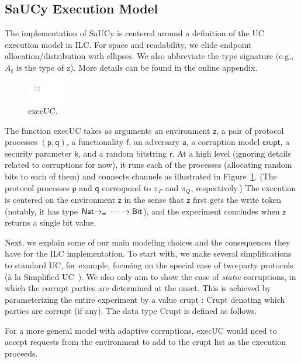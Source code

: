 \subsection{SaUCy Execution Model}
\label{subsec:concrete-uc}


The implementation of SaUCy is centered around a definition of the UC execution
model in ILC. For space and readability, we elide endpoint
allocation/distribution with ellipses. We also abbreviate the type signature
(e.g., $A_{\mathsf{z}}$ is the type of \textsf{z}). More details can be found in
the online appendix.


\begingroup
\setlength\intextsep{0pt}
\setlength{\columnsep}{10pt}
\begin{figure}
\centering
\includegraphics[width=0.15\textwidth]{graphics/execUC}
\caption{\textsf{execUC}.}
\label{fig:execUC-diagram}
\end{figure}
The function \textsf{execUC} takes as arguments an environment $\mathsf{z}$, a
pair of protocol processes $(\mathsf{p},\mathsf{q})$, a functionality
$\mathsf{f}$, an adversary $\mathsf{a}$, a corruption model $\mathsf{crupt}$, a
security parameter $\mathsf{k}$, and a random bitstring $\mathsf{r}$. At a high
level (ignoring details related to corruptions for now), it runs each of the
processes (allocating random bits to each of them) and connects channels as
illustrated in Figure~\ref{fig:execUC-diagram}.
(The protocol processes
$\mathsf{p}$ and $\mathsf{q}$ correspond to $\pi_P$ and $\pi_Q$, respectively.)
The execution is centered on the environment $\mathsf{z}$ in the sense that
$\mathsf{z}$ first gets the write token (notably, it has type $\mathsf{Nat}
{->}_{\textsf{w}}\ \cdots -> \textnormal{\textsf{Bit}}$), and the experiment concludes when $\mathsf{z}$
returns a single bit value.

Next, we explain some of our main modeling choices and the consequences they
have for the ILC implementation. To start with, we make several simplifications
to standard UC, for example, focusing on the special case of two-party protocols
(\`{a} la Simplified UC~\cite{canetti2015simpler}).  We also only aim to show
the case of \emph{static} corruptions, in which the corrupt parties are
determined at the onset.  This is achieved by parameterizing the entire
experiment by a value \textsf{crupt : Crupt} denoting which parties are corrupt (if
any). The data type \textsf{Crupt} is defined as follows.

For a more general model with adaptive corruptions, \textsf{execUC} would need
to accept requests from the environment to add to the \textsf{crupt} list as the
execution proceeds.
\endgroup

